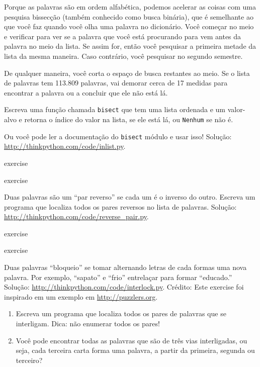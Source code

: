 \documentclass[10pt]{book}
\begin{document}
\begin{exercise}
\begin{}
Porque as palavras são em ordem alfabética, podemos acelerar as coisas
com uma pesquisa bissecção (também conhecido como busca binária), que é
semelhante ao que você faz quando você olha uma palavra no dicionário. Você
começar no meio e verificar para ver se a palavra que você está procurando
para vem antes da palavra no meio da lista. Se assim for, então você
pesquisar a primeira metade da lista da mesma maneira. Caso contrário, você pesquisar
no segundo semestre.

De qualquer maneira, você corta o espaço de busca restantes ao meio. Se o
lista de palavras tem 113.809 palavras, vai demorar cerca de 17 medidas para
encontrar a palavra ou a concluir que ele não está lá.

Escreva uma função chamada {\tt bisect} que tem uma lista ordenada
e um valor-alvo e retorna o índice do valor
na lista, se ele está lá, ou {\tt Nenhum} se não é.

Ou você pode ler a documentação do {\tt bisect} módulo
e usar isso! Solução: \url{http://thinkpython.com/code/inlist.py}.

\end{} exercise

\begin{} exercise

Duas palavras são um ``par reverso'' se cada um é o inverso do
outro. Escreva um programa que localiza todos os pares reversos no
lista de palavras. Solução: \url{http://thinkpython.com/code/reverse_pair.py}.

\end{} exercise

\begin{} exercise

Duas palavras ``bloqueio'' se tomar alternando letras de cada formas
uma nova palavra. Por exemplo, ``sapato'' e ``frio''
entrelaçar para formar ``educado.''
Solução: \url{http://thinkpython.com/code/interlock.py}.
Crédito: Este exercise foi inspirado em um exemplo em \url{http://puzzlers.org}.

\begin{enumerate}

\item Escreva um programa que localiza todos os pares de palavras que se interligam.
  Dica: não enumerar todos os pares!

\item Você pode encontrar todas as palavras que são de três vias interligadas, ou seja,
  cada terceira carta forma uma palavra, a partir da primeira, segunda ou
  terceiro?


\end{enumerate}
\end{}
\end{exercise}
\end{document}

